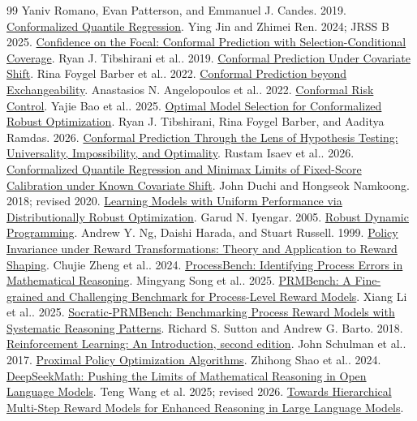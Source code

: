 \begin{thebibliography}{99}
 Yaniv Romano, Evan Patterson, and Emmanuel J. Candes. 2019. \href{https://arxiv.org/abs/1905.03222}{Conformalized Quantile Regression}.
 Ying Jin and Zhimei Ren. 2024; JRSS B 2025. \href{https://arxiv.org/abs/2403.03868}{Confidence on the Focal: Conformal Prediction with Selection-Conditional Coverage}.
 Ryan J. Tibshirani et al.. 2019. \href{https://arxiv.org/abs/1904.06019}{Conformal Prediction Under Covariate Shift}.
 Rina Foygel Barber et al.. 2022. \href{https://arxiv.org/abs/2202.13415}{Conformal Prediction beyond Exchangeability}.
 Anastasios N. Angelopoulos et al.. 2022. \href{https://arxiv.org/abs/2208.02814}{Conformal Risk Control}.
 Yajie Bao et al.. 2025. \href{https://arxiv.org/abs/2507.04716}{Optimal Model Selection for Conformalized Robust Optimization}.
 Ryan J. Tibshirani, Rina Foygel Barber, and Aaditya Ramdas. 2026. \href{https://arxiv.org/abs/2608.27310}{Conformal Prediction Through the Lens of Hypothesis Testing: Universality, Impossibility, and Optimality}.
 Rustam Isaev et al.. 2026. \href{https://arxiv.org/abs/2609.24929}{Conformalized Quantile Regression and Minimax Limits of Fixed-Score Calibration under Known Covariate Shift}.
 John Duchi and Hongseok Namkoong. 2018; revised 2020. \href{https://arxiv.org/abs/1810.08750}{Learning Models with Uniform Performance via Distributionally Robust Optimization}.
 Garud N. Iyengar. 2005. \href{https://doi.org/10.1287/moor.1040.0129}{Robust Dynamic Programming}.
 Andrew Y. Ng, Daishi Harada, and Stuart Russell. 1999. \href{https://people.eecs.berkeley.edu/~russell/papers/icml99-shaping.pdf}{Policy Invariance under Reward Transformations: Theory and Application to Reward Shaping}.
 Chujie Zheng et al.. 2024. \href{https://arxiv.org/abs/2412.06559}{ProcessBench: Identifying Process Errors in Mathematical Reasoning}.
 Mingyang Song et al.. 2025. \href{https://arxiv.org/abs/2501.03124}{PRMBench: A Fine-grained and Challenging Benchmark for Process-Level Reward Models}.
 Xiang Li et al.. 2025. \href{https://arxiv.org/abs/2505.23474}{Socratic-PRMBench: Benchmarking Process Reward Models with Systematic Reasoning Patterns}.
 Richard S. Sutton and Andrew G. Barto. 2018. \href{https://www.incompleteideas.net/book/bookdraft2018mar21.pdf}{Reinforcement Learning: An Introduction, second edition}.
 John Schulman et al.. 2017. \href{https://arxiv.org/abs/1707.06347}{Proximal Policy Optimization Algorithms}.
 Zhihong Shao et al.. 2024. \href{https://arxiv.org/abs/2402.03300}{DeepSeekMath: Pushing the Limits of Mathematical Reasoning in Open Language Models}.
 Teng Wang et al. 2025; revised 2026. \href{https://arxiv.org/abs/2503.13551}{Towards Hierarchical Multi-Step Reward Models for Enhanced Reasoning in Large Language Models}.
\end{thebibliography}
